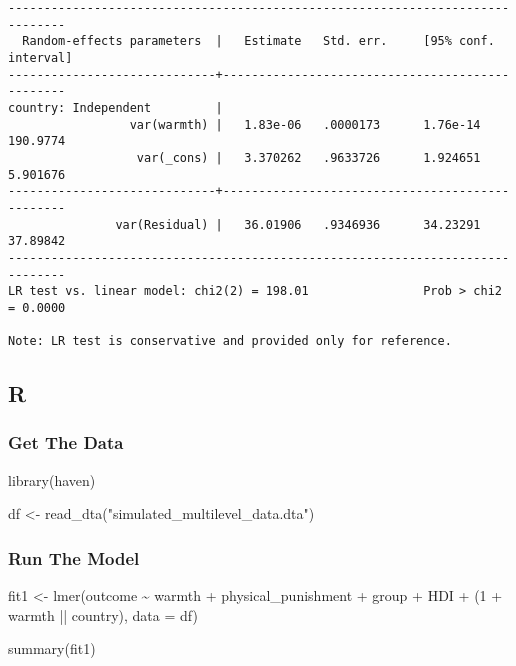 \documentclass[
  letterpaper,
  DIV=11,
  numbers=noendperiod]{scrreprt}
\newenvironment{Shaded}{\begin{snugshade}}{\end{snugshade}}
\newcommand{\AttributeTok}[1]{\textcolor[rgb]{0.40,0.45,0.13}{#1}}
\newcommand{\DecValTok}[1]{\textcolor[rgb]{0.68,0.00,0.00}{#1}}
\newcommand{\FunctionTok}[1]{\textcolor[rgb]{0.28,0.35,0.67}{#1}}
\newcommand{\NormalTok}[1]{\textcolor[rgb]{0.00,0.23,0.31}{#1}}
\newcommand{\OtherTok}[1]{\textcolor[rgb]{0.00,0.23,0.31}{#1}}
\newcommand{\SpecialCharTok}[1]{\textcolor[rgb]{0.37,0.37,0.37}{#1}}
\newcommand{\StringTok}[1]{\textcolor[rgb]{0.13,0.47,0.30}{#1}}
\begin{document}
\begin{verbatim}
------------------------------------------------------------------------------
  Random-effects parameters  |   Estimate   Std. err.     [95% conf. interval]
-----------------------------+------------------------------------------------
country: Independent         |
                 var(warmth) |   1.83e-06   .0000173      1.76e-14    190.9774
                  var(_cons) |   3.370262   .9633726      1.924651    5.901676
-----------------------------+------------------------------------------------
               var(Residual) |   36.01906   .9346936      34.23291    37.89842
------------------------------------------------------------------------------
LR test vs. linear model: chi2(2) = 198.01                Prob > chi2 = 0.0000

Note: LR test is conservative and provided only for reference.
\end{verbatim}

\subsection{R}

\subsubsection{Get The Data}\label{get-the-data-1}

\begin{Shaded}
\begin{Highlighting}[]
\FunctionTok{library}\NormalTok{(haven)}

\NormalTok{df }\OtherTok{\textless{}{-}} \FunctionTok{read\_dta}\NormalTok{(}\StringTok{"simulated\_multilevel\_data.dta"}\NormalTok{)}
\end{Highlighting}
\end{Shaded}

\subsubsection{Run The Model}\label{run-the-model-1}

\begin{Shaded}
\begin{Highlighting}[]
\NormalTok{fit1 }\OtherTok{\textless{}{-}} \FunctionTok{lmer}\NormalTok{(outcome }\SpecialCharTok{\textasciitilde{}}\NormalTok{ warmth }\SpecialCharTok{+}\NormalTok{ physical\_punishment }\SpecialCharTok{+} 
\NormalTok{               group }\SpecialCharTok{+}\NormalTok{ HDI }\SpecialCharTok{+}
\NormalTok{               (}\DecValTok{1} \SpecialCharTok{+}\NormalTok{ warmth }\SpecialCharTok{||}\NormalTok{ country),}
             \AttributeTok{data =}\NormalTok{ df)}

\FunctionTok{summary}\NormalTok{(fit1)}
\end{Highlighting}
\end{Shaded}
\end{document}
